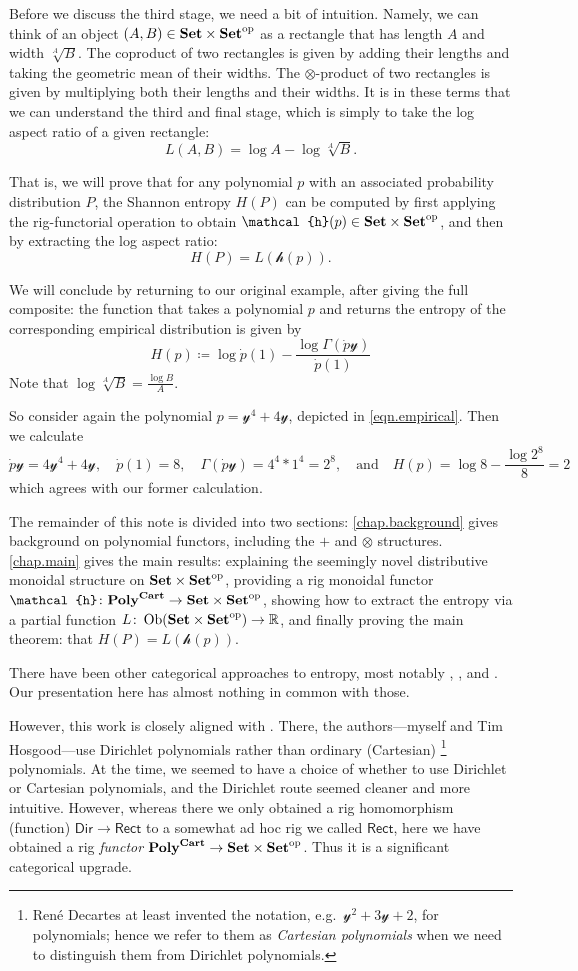 \documentclass[11pt, one side, article]{memoir}
\theoremstyle{definition}
\theoremstyle{plain}
\DeclareMathOperator{\ob}{Ob}
\newcommand{\Set}[1]{\mathsf{#1}}%
\newcommand{\Cat}[1]{\mathbf{#1}}%
\newcommand{\op}{^\tn{op}}
\newcommand{\tn}[1]{\textnormal{#1}}
\newcommand{\rr}{\mathbb{R}}
\newcommand{\smset}{\Cat{Set}}
\newcommand{\yon}{\mathcal{y}}
\newcommand{\poly}{\Cat{Poly}}
\newcommand{\dir}{\Set{Dir}}
\newcommand{\rect}{\Set{Rect}}
\newcommand{\polycart}{\poly^{\Cat{Cart}}}
\newcommand{\hh}{\mathcal{h}}
\newcommand{\0}{\textsf{0}}
\newcommand{\1}{\tn{\textsf{1}}}
\newcommand{\qand}{\quad\text{and}\quad}
\begin{document}
Before we discuss the third stage, we need a bit of intuition. Namely, we can think of an object $(A,B)\in\smset\times\smset\op$ as a rectangle that has length $A$ and width $\sqrt[A]{B}$. The coproduct of two rectangles is given by adding their lengths and taking the geometric mean of their widths. The $\otimes$-product of two rectangles is given by multiplying both their lengths and their widths. It is in these terms that we can understand the third and final stage, which is simply to take the log aspect ratio of a given rectangle:
\[L(A,B)=\log A-\log\sqrt[A]{B}.\]

That is, we will prove that for any polynomial $p$ with an associated probability distribution $P$, the Shannon entropy $H(P)$ can be computed by first applying the rig-functorial operation to obtain $\hh(p)\in\smset\times\smset\op$, and then by extracting the log aspect ratio:
\[
H(P)=L(\hh(p)).
\]

We will conclude by returning to our original example, after giving the full composite: the function that takes a polynomial $p$ and returns the entropy of the corresponding empirical distribution is given by
\[
  H(p)\coloneqq\log \dot{p}(1)-\frac{\log\Gamma(\dot{p}\yon)}{\dot{p}(1)}
\]
Note that $\log\sqrt[A]{B}=\frac{\log B}{A}$.

So consider again the polynomial $p=\yon^4+4\yon$, depicted in \eqref{eqn.empirical}. Then we calculate
\[
\dot{p}\yon=4\yon^4+4\yon
,\quad
\dot{p}(1)=8
,\quad
\Gamma(\dot{p}\yon)=4^4*1^4=2^8
,\qand 
H(p)=\log 8-\frac{\log 2^8}{8}=2
\]
which agrees with our former calculation. 

The remainder of this note is divided into two sections: \cref{chap.background} gives background on polynomial functors, including the $+$ and $\otimes$ structures. \cref{chap.main} gives the main results: explaining the seemingly novel distributive monoidal structure on $\smset\times\smset\op$, providing a rig monoidal functor $\hh\colon\polycart\to\smset\times\smset\op$, showing how to extract the entropy via a partial function $L\colon\ob(\smset\times\smset\op)\to\rr$, and finally proving the main theorem: that $H(P)=L(\hh(p))$.

There have been other categorical approaches to entropy, most notably \cite{baez2011characterization}, \cite{baez2014bayesian}, and \cite{leinster2021entropy}. Our presentation here has almost nothing in common with those. 

However, this work is closely aligned with \cite{spivak2021dirichlet}. There, the authors---myself and Tim Hosgood---use Dirichlet polynomials rather than ordinary (Cartesian)%
\footnote{Ren\'{e} Decartes at least invented the notation, e.g.\ $\yon^2+3\yon+2$, for polynomials; hence we refer to them as \emph{Cartesian polynomials} when we need to distinguish them from Dirichlet polynomials.}
polynomials. At the time, we seemed to have a choice of whether to use Dirichlet or Cartesian polynomials, and the Dirichlet route seemed cleaner and more intuitive. However, whereas there we only obtained a rig homomorphism (function) $\dir\to\rect$ to a somewhat ad hoc rig we called $\rect$, here we have obtained a rig \emph{functor} $\polycart\to\smset\times\smset\op$. Thus it is a significant categorical upgrade.
\end{document}
